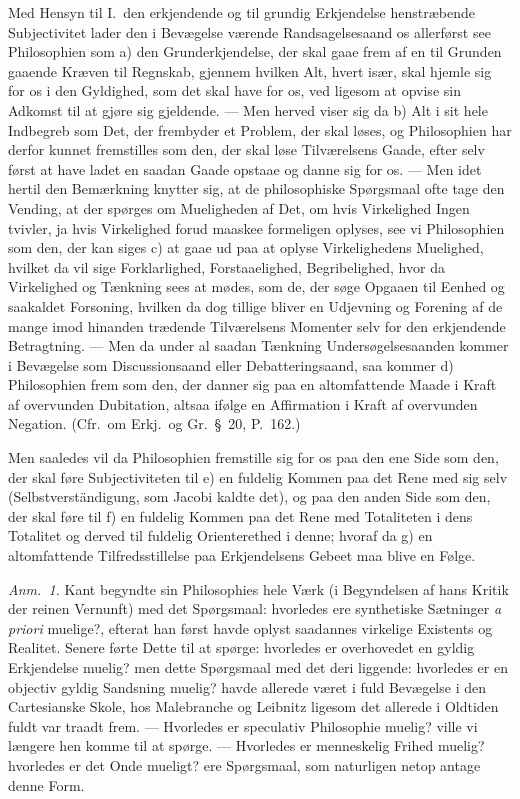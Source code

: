 \documentclass[12pt,a4paper]{book}
\newcommand{\apage}[1]{\marginnote{\footnotesize\textit{[#1]}}}
\begin{document}
Med Hensyn til I.~den erkjendende og til grundig Erkjendelse henstræbende
Subjectivitet lader den i Bevægelse værende Randsagelsesaand os allerførst see
Philosophien som a) den Grunderkjendelse, der skal gaae frem af en til Grunden
gaaende Kræven til Regnskab, gjennem hvilken Alt, hvert især, skal hjemle sig for os
i den Gyldighed, som det skal have for os, ved ligesom at opvise sin Adkomst til at
gjøre sig gjeldende. --- Men herved viser sig da b) Alt i sit hele Indbegreb som
Det, der frembyder et Problem, der skal løses, og Philosophien har derfor kunnet
fremstilles som den, der skal løse Tilværelsens Gaade, efter selv først at have  \apage{43}
ladet en saadan Gaade opstaae og danne sig for os. --- Men idet hertil den
Bemærkning knytter sig, at de philosophiske Spørgsmaal ofte tage den Vending, at der
spørges om Mueligheden af Det, om hvis Virkelighed Ingen tvivler, ja hvis
Virkelighed forud maaskee formeligen oplyses, see vi Philosophien som den, der kan
siges c) at gaae ud paa at oplyse Virkelighedens Muelighed, hvilket da vil sige
Forklarlighed, Forstaaelighed, Begribelighed, hvor da Virkelighed og Tænkning sees
at mødes, som de, der søge Opgaaen til Eenhed og saakaldet Forsoning, hvilken da dog
tillige bliver en Udjevning og Forening af de mange imod hinanden trædende
Tilværelsens Momenter selv for den erkjendende Betragtning. --- Men da under al
saadan Tænkning Undersøgelsesaanden kommer i Bevægelse som Discussionsaand eller
Debatteringsaand, saa kommer d) Philosophien frem som den, der danner sig paa en
altomfattende Maade i Kraft af overvunden Dubitation, altsaa ifølge en Affirmation i
Kraft af overvunden Negation. (Cfr.\ om Erkj.\ og Gr.\ \S~20, P.\ 162.)

Men saaledes vil da Philosophien fremstille sig for os paa den ene Side som den, der
skal føre Subjectiviteten til e) en fuldelig Kommen paa det Rene med sig selv
(Selbstverständigung, som Jacobi kaldte det), og paa den anden Side som den, der
skal føre til f) en fuldelig Kommen paa det Rene med Totaliteten i dens Totalitet og
derved til fuldelig Orienterethed i denne; hvoraf da g) en altomfattende
Tilfredsstillelse paa Erkjendelsens Gebeet maa blive en Følge.
  \apage{44}
{\small

\emph{Anm.~1.} Kant begyndte sin Philosophies hele Værk (i Begyndelsen af
hans Kritik der reinen Vernunft) med det Spørgsmaal: hvorledes ere synthetiske
Sætninger \textit{a priori} muelige?, efterat han først havde oplyst saadannes
virkelige Existents og Realitet. Senere førte Dette til at spørge: hvorledes er
overhovedet en gyldig Erkjendelse muelig? men dette Spørgsmaal med det deri
liggende: hvorledes er en objectiv gyldig Sandsning muelig? havde allerede været i
fuld Bevægelse i den Cartesianske Skole, hos Malebranche og Leibnitz ligesom det
allerede i Oldtiden fuldt var traadt frem. --- Hvorledes er speculativ Philosophie
muelig? ville vi længere hen komme til at spørge. --- Hvorledes er menneskelig
Frihed muelig? hvorledes er det Onde mueligt? ere Spørgsmaal, som naturligen netop
antage denne Form.\par}
\end{document}
